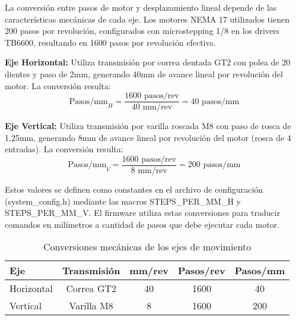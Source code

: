 La conversión entre pasos de motor y desplazamiento lineal depende de las características mecánicas de cada eje. Los motores NEMA 17 utilizados tienen 200 pasos por revolución, configurados con microstepping 1/8 en los drivers TB6600, resultando en 1600 pasos por revolución efectiva.

\textbf{Eje Horizontal:} Utiliza transmisión por correa dentada GT2 con polea de 20 dientes y paso de 2mm, generando 40mm de avance lineal por revolución del motor. La conversión resulta:
\begin{equation}
\text{Pasos/mm}_H = \frac{1600 \text{ pasos/rev}}{40 \text{ mm/rev}} = 40 \text{ pasos/mm}
\end{equation}

\textbf{Eje Vertical:} Utiliza transmisión por varilla roscada M8 con paso de rosca de 1.25mm, generando 8mm de avance lineal por revolución del motor (rosca de 4 entradas). La conversión resulta:
\begin{equation}
\text{Pasos/mm}_V = \frac{1600 \text{ pasos/rev}}{8 \text{ mm/rev}} = 200 \text{ pasos/mm}
\end{equation}

Estos valores se definen como constantes en el archivo de configuración (system\_config.h) mediante las macros STEPS\_PER\_MM\_H y STEPS\_PER\_MM\_V. El firmware utiliza estas conversiones para traducir comandos en milímetros a cantidad de pasos que debe ejecutar cada motor.

\begin{table}[H]
\centering
\begin{tabular}{|l|c|c|c|c|}
\hline
\textbf{Eje} & \textbf{Transmisión} & \textbf{mm/rev} & \textbf{Pasos/rev} & \textbf{Pasos/mm} \\
\hline
Horizontal & Correa GT2 & 40 & 1600 & 40 \\
\hline
Vertical & Varilla M8 & 8 & 1600 & 200 \\
\hline
\end{tabular}
\caption{Conversiones mecánicas de los ejes de movimiento}
\label{tab:conversiones_mecanicas}
\end{table}
